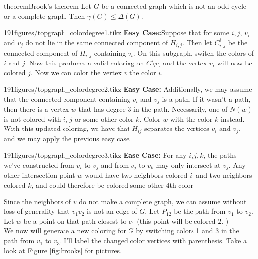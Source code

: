 \begin{doubledpage}{theorem}{Brook's theorem \cite{brooks1941colouring}}{ 
  Let $G$ be a connected graph which is not an odd cycle or a complete graph. Then $\gamma(G)\leq \Delta(G)$. \label{emb:thm:brooks}}
\begin{paragraphfigureenv}{191figures/topgraph_colordegree1.tikz}
\textbf{Easy Case:}Suppose that for some $i, j$, $v_i$ and $v_j$ do not lie in the same connected component of $H_{i,j}$. Then let $C^i_{i,j}$ be the connected component of $H_{i,j}$ containing $v_i$. On this subgraph, switch the colors of $i$ and $j$. Now this produces a valid coloring on $G\setminus v$, and the vertex $v_i$ will now be colored $j$. Now we can color the vertex $v$ the color $i$.  
\end{paragraphfigureenv}
\begin{paragraphfigureenv}{191figures/topgraph_colordegree2.tikz}
\textbf{Easy Case:} Additionally, we may assume that the connected component containing $v_i$ and $v_j$ is a path. If it wasn't a path, then there is a vertex $w$ that has degree 3 in the path. Necessarily, one of $N(w)$ is not colored with $i$, $j$ or some other color $k$. Color $w$ with the color $k$ instead. With this updated coloring, we have that $H_{ij}$ separates the vertices $v_i$ and $v_j$, and we may apply the previous easy case. 
\end{paragraphfigureenv}
\begin{paragraphfigureenv}{191figures/topgraph_colordegree3.tikz}
  \textbf{Ease Case:} For any $i, j, k$, the paths we've constructed from $v_i$ to $v_j$ and from $v_j$ to $v_k$ may only intersect at $v_j$. Any other intersection point $w$ would have two neighbors colored $i$, and two neighbors colored $k$, and could therefore be colored some other 4th color
\end{paragraphfigureenv}


Since the neighbors of $v$ do not make a complete graph, we can assume without loss of generality that $v_1v_2$ is not an edge of $G$.  Let $P_{12}$ be the path from $v_1$ to $v_2$. 
Let $w$ be a point on that path closest to $v_1$ (this point will be colored $2$. ) \\
We now will generate a new coloring for $G$ by switching colors 1 and 3 in the path from $v_1$ to $v_3$. I'll label the changed color vertices with parenthesis. Take a look at Figure \ref{fig:brooks} for pictures.

\begin{figure}[h]
  
\centering
{}
\end{figure}
\end{doubledpage}
